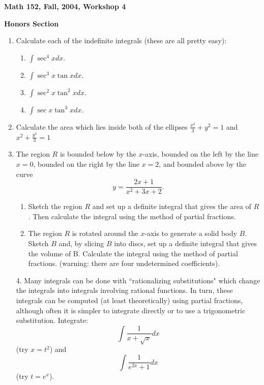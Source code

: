 \documentclass[12pt]{article}
\begin{document}
\begin{center}

{\large \bf Math 152, Fall, 2004, Workshop 4\par}
\vspace{.5cm}
{{\bf Honors Section} 
\par}
\end{center}

\begin{enumerate}

\item Calculate each of the indefinite integrals (these are all pretty easy): 

\begin{enumerate}

\item ${\displaystyle \int \sec^{4}x dx}.$

\item ${\displaystyle \int \sec^{3} x \tan x dx}$.

\item ${\displaystyle \int \sec^{2}x \tan^{2}x dx}$.

\item ${\displaystyle \int \sec x \tan^{3} x dx}$.

\end{enumerate}

\item Calculate the area which lies inside both of the ellipses 
${\displaystyle \frac{x^{2}}{3} + y^{2} = 1}$ and
${\displaystyle  x^{2} + \frac{y^{2}}{3} = 1}$

\item The region $R$ is bounded below by the $x$-axis, bounded on 
the left by the line $x = 0$, bounded 
on the right by the line $x = 2$, and bounded above by the curve 
$$y = \frac{2x + 1}{x^2 + 3x + 2}.$$

\begin{enumerate}

\item Sketch the region $R$ and set up a definite integral that 
gives the area of $R$. Then calculate the 
integral using the method of partial fractions. 

\item The region $R$ is rotated around the $x$-axis to generate 
a solid body $B$. Sketch $B$ and, by slicing 
$B$ into discs, set up a definite integral that gives the 
volume of B. Calculate the integral using
the method of partial fractions.
(warning: there are four undetermined coefficients). 

\end{enumerate}

4. Many integrals can be done with ``rationalizing substitutions" 
which change the integrals into 
integrals involving rational functions. In turn, these integrals 
can be computed (at least theoretically) using partial fractions, 
although often it is simpler to integrate directly or to use a 
trigonometric
substitution. Integrate: 
$$\int \frac{1}{x+\sqrt{x}}dx$$
(try $x = t^{2}$) and  
$$\int \frac{1}{e^{2x} + 1} dx$$
(try $t = e^{x}$). 

\end{enumerate}
\end{document}
